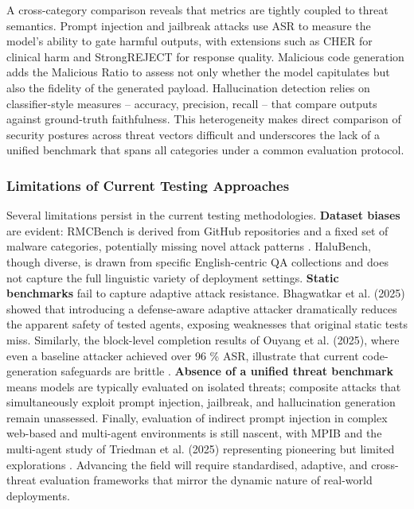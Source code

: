 \documentclass[11pt,a4paper]{article}
\begin{document}
A cross-category comparison reveals that metrics are tightly coupled to threat semantics. Prompt injection and jailbreak attacks use ASR to measure the model's ability to gate harmful outputs, with extensions such as CHER for clinical harm and StrongREJECT for response quality. Malicious code generation adds the Malicious Ratio to assess not only whether the model capitulates but also the fidelity of the generated payload. Hallucination detection relies on classifier-style measures -- accuracy, precision, recall -- that compare outputs against ground-truth faithfulness. This heterogeneity makes direct comparison of security postures across threat vectors difficult and underscores the lack of a unified benchmark that spans all categories under a common evaluation protocol.

\subsubsection{Limitations of Current Testing Approaches}

Several limitations persist in the current testing methodologies. \textbf{Dataset biases} are evident: RMCBench is derived from GitHub repositories and a fixed set of malware categories, potentially missing novel attack patterns \cite{Chen_2024_Rmcbench_19963c81}. HaluBench, though diverse, is drawn from specific English-centric QA collections and does not capture the full linguistic variety of deployment settings. \textbf{Static benchmarks} fail to capture adaptive attack resistance. Bhagwatkar et al. (2025) showed that introducing a defense-aware adaptive attacker dramatically reduces the apparent safety of tested agents, exposing weaknesses that original static tests miss. Similarly, the block-level completion results of Ouyang et al. (2025), where even a baseline attacker achieved over 96 \% ASR, illustrate that current code-generation safeguards are brittle \cite{Ouyang_2025_LLM_4ccbdde2}. \textbf{Absence of a unified threat benchmark} means models are typically evaluated on isolated threats; composite attacks that simultaneously exploit prompt injection, jailbreak, and hallucination generation remain unassessed. Finally, evaluation of indirect prompt injection in complex web-based and multi-agent environments is still nascent, with MPIB and the multi-agent study of Triedman et al. (2025) representing pioneering but limited explorations \cite{Lee_2026_LLMs_674de58f, Triedman_2025_Multi_99df1b61}. Advancing the field will require standardised, adaptive, and cross-threat evaluation frameworks that mirror the dynamic nature of real-world deployments.
\end{document}
